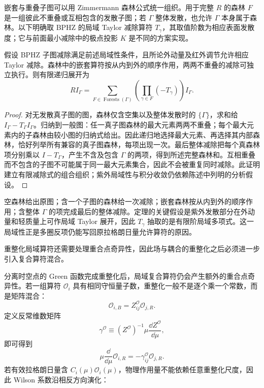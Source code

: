 嵌套与重叠子图可以用 Zimmermann 森林公式统一组织。用于完整 $R$ 的森林 $F$ 是一组彼此不重叠或互相包含的发散子图；若 $\Gamma$ 整体发散，也允许 $\Gamma$ 本身属于森林。以下明确取 BPHZ 的局域 Taylor 减除算符 $T_\gamma$，其取值阶数为相应表面发散度；它与前面最小减除中的极点投影 $K$ 是不同的方案实现。
\begin{corollary}[递归局域减除的森林组织]
假设 BPHZ 子图减除满足前述局域性条件，且所论外动量及红外调节允许相应 Taylor 减除。森林中的嵌套算符按从内到外的顺序作用，两两不重叠的减除可独立执行。则有限递归展开为
\begin{equation}
 {
 RI_\Gamma
 =\sum_{F\in\operatorname{Forests}(\Gamma)}
 \left(\prod_{\gamma\in F}(-T_\gamma)\right)I_\Gamma.}
 \label{eq:zimmermann-forest-dp11}
\end{equation}
\end{corollary}
\begin{proof}
对无发散真子图的图，森林仅含空集以及整体发散时的 $\{\Gamma\}$，求和给 $I_\Gamma-T_\Gamma I_\Gamma$。归纳到一般图：任一真子图森林的最大元素两两不重叠；每个最大元素内的子森林由较小图的归纳式给出。因此递归地选择最大元素、再选择其内部森林，恰好列举所有兼容的真子图森林，每项出现一次。最后整体减除把每个真森林项分别乘以 $I-T_\Gamma$，产生不含及包含 $\Gamma$ 的两项，得到所述完整森林和。互相重叠而不包含的子图不可能属于同一最大元素集合，因此不会被重复同时减除。此证明建立有限减除式的组合组织；紫外局域性与积分收敛仍依赖陈述中列明的分析假设。
\end{proof}
空森林给出原图；含一个子图的森林给一次减除；嵌套森林按从内到外的顺序作用；含整体 $\Gamma$ 的项完成最后的整体减除。定理的关键假设是紫外发散部分在外动量和轻质量上可作局域 Taylor 展开，因此 $T_\gamma$ 抽取的是有限阶局域多项式。这一局域性正是多圈反项仍能写回原拉格朗日量允许算符的原因。

重整化局域算符还需要处理重合点奇异性，因此场与耦合的重整化之后必须进一步引入复合算符混合。

分离时空点的 Green 函数完成重整化后，局域复合算符仍会产生额外的重合点奇异性。若一组算符 $\mathcal O_i$ 具有相同守恒量子数，重整化一般不是逐个乘一个常数，而是矩阵混合：
\begin{equation}
 {\mathcal O_{i,B}=Z_{ij}^{\mathcal O}\mathcal O_{j,R}.}
 \label{eq:composite-operator-mixing-dp11}
\end{equation}
定义反常维数矩阵
\begin{equation*}
 \gamma^{\mathcal O}
 \equiv (Z^{\mathcal O})^{-1}\mu\frac{\dd Z^{\mathcal O}}{\dd\mu},
\end{equation*}
即可得到
\begin{equation*}
 \mu\frac{\dd}{\dd\mu}\mathcal O_{i,R}
 =-\gamma_{ij}^{\mathcal O}\mathcal O_{j,R}.
\end{equation*}
若有效拉格朗日量含 $C_i(\mu)\mathcal O_i(\mu)$，物理作用量不能依赖任意重整化尺度，因此 Wilson 系数沿相反方向演化：


